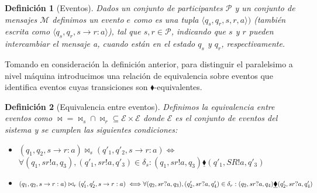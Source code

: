 \documentclass[paper=a4, fontsize=11pt, spanish]{scrartcl} %
\numberwithin{equation}{section} %
\numberwithin{figure}{section} %
\numberwithin{table}{section} %
\newtheorem{definition}{Definición}
\newcommand{\romboeqn}{\underline{\blacklozenge}}
\begin{document}
\begin{definition}[Eventos] Dados un conjunto de participantes $\mathcal{P}$ y un conjunto de mensajes $\mathcal{M}$ definimos un evento $e$ como es una tupla $\langle q_s, q_r, s, r, a \rangle)$ (también escrita como $\langle q_s, q_r, s \rightarrow r:a \rangle$), tal que $s,r \in \mathcal{P}$, indicando que $s$ y $r$ pueden intercambiar el mensaje a, cuando están en el estado $q_s$ y $q_r$, respectivamente.
\end{definition}

 Tomando en consideración la definición anterior, para distinguir el paralelsimo a nivel máquina introducimos una relación de equivalencia sobre eventos que identifica eventos cuyas transiciones son $\blacklozenge$-equivalentes.

\begin{definition}[Equivalencia entre eventos] Definimos la equivalencia entre eventos como $\bowtie = \bowtie_s \cap \bowtie_r \subseteq \mathcal{E} \times \mathcal{E}$ donde $\mathcal{E}$ es el conjunto de eventos del sistema y se cumplen las siguientes condiciones:

\begin{itemize}
\item $(q_1, q_2, s \rightarrow r:a) \bowtie_s (q'_1, q'_2, s \rightarrow r:a) \iff$ \\ 
 $\forall (q_1, sr!a,q_3),(q'_1, sr!a,q'_3) \in \delta_s:(q_1, sr!a,q_3) \underline{\blacklozenge} (q'_1, SR!a,q'_3) $
\item $(q_1, q_2, s \rightarrow r:a) \bowtie_r (q'_1, q'_2, s \rightarrow r:a) \iff \\ 
\forall (q_2, sr?a,q_3),(q'_2, sr?a,q'_4) \in \delta_ r:(q_2, sr?a,q_4) \romboeqn (q'_2, sr?a,q'_4)$ \end{itemize}
\end{definition}
\end{document}
